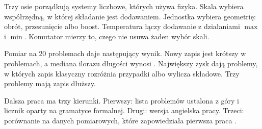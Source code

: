 \documentclass[11pt,a4paper]{article}
\begin{document}
Trzy osie porządkują systemy liczbowe, których używa fizyka. Skala wybiera
współrzędną, w której składanie jest dodawaniem. Jednostka wybiera geometrię:
obrót, przesunięcie albo boost. Temperatura łączy dodawanie z działaniami
$\max$ i $\min$. Komutator mierzy to, czego nie usuwa żaden wybór skali.

Pomiar na 20 problemach daje następujący wynik. Nowy zapis jest krótszy
w \gcShorter{} problemach, a mediana ilorazu długości wynosi \gcMedian.
Największy zysk dają problemy, w których zapis klasyczny rozróżnia przypadki
albo wylicza składowe. Trzy problemy mają zapis dłuższy.

Dalsza praca ma trzy kierunki. Pierwszy: lista problemów ustalona z góry
i licznik oparty na gramatyce formalnej. Drugi: wersja angielska pracy. Trzeci:
porównanie na danych pomiarowych, które zapowiedziała pierwsza praca
\cite{szulia2026}.
\end{document}
